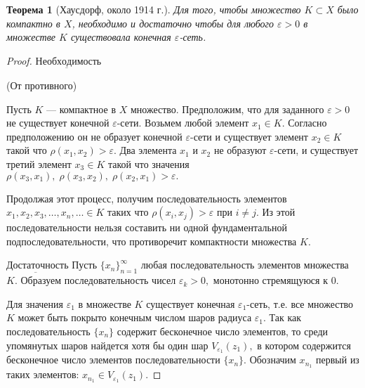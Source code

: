 \documentclass[12pt,a4paper,titlepage, oneside]{book}
\theoremstyle{definition}
\theoremstyle{plain}
\newtheorem*{theorem}{Теорема}
\theoremstyle{remark}
\theoremstyle{remark}
\theoremstyle{remark}
\theoremstyle{remark}
\theoremstyle{plain}
\theoremstyle{plain}
\begin{document}
\begin{theorem}[Хаусдорф, около 1914 г.]
Для того, чтобы множество $K \subset X$ было компактно в $X$, необходимо и достаточно чтобы для любого $\varepsilon > 0$ в множестве $K$ существовала конечная $\varepsilon$-сеть. 
\end{theorem}
\begin{proof}

$\underbar{Необходимость}$

(От противного)

Пусть $K$  --- компактное в $X$ множество. Предположим, что для заданного $\varepsilon >0 $ не существует конечной $\varepsilon$-сети. Возьмем любой элемент $x_1 \in K.$ Согласно предположению он не образует конечной $\varepsilon$-сети и существует элемент $x_2 \in K$ такой что $\rho(x_1, x_2) > \varepsilon.$ Два элемента $x_1$ и $x_2$ не образуют $\varepsilon$-сети, и существует третий элемент $x_3 \in K$ такой что значения $\rho(x_3, x_1), \; \rho(x_3, x_2), \; \rho(x_2, x_1) > \varepsilon.$

Продолжая этот процесс, получим последовательность элементов $x_1,x_2,x_3, \ldots, x_n, \ldots \in K$ таких что $\rho(x_i, x_j) > \varepsilon$ при   $i \neq j.$ Из этой последовательности нельзя составить ни одной фундаментальной подпоследовательности, что противоречит компактности множества $K.$

$\underbar{Достаточность}$ Пусть $\{x_n\}_{n=1}^{\infty}$ любая последовательность элементов множества $K.$ Образуем последовательность чисел $\varepsilon _k > 0,$ монотонно стремящуюся к $0.$

Для значения $\varepsilon _1$  в множестве $K$ существует конечная $\varepsilon _1$-сеть, т.е. все множество $K$ может быть покрыто конечным числом шаров радиуса $\varepsilon _1 .$ Так как последовательность $\{ x_n \}$ содержит бесконечное число элементов, то среди упомянутых шаров найдется хотя бы один шар $V_{\varepsilon _1} (z_1),$ в котором содержится бесконечное число элементов последовательности $\{x_n\}.$ Обозначим $x_{n_1}$ первый из таких элементов: $x_{n_1} \in V_{\varepsilon _1} (z_1).$


\end{proof}
\end{document}
